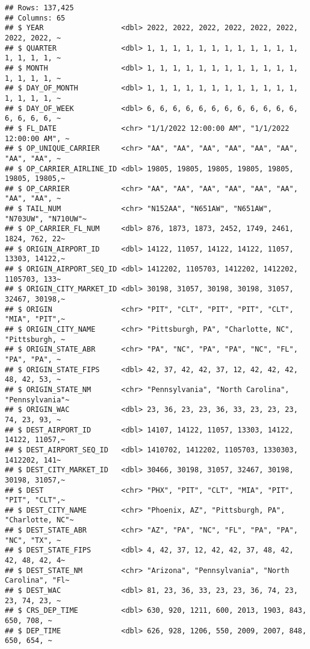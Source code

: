 \documentclass[
]{article}
\begin{document}
\begin{verbatim}
## Rows: 137,425
## Columns: 65
## $ YEAR                  <dbl> 2022, 2022, 2022, 2022, 2022, 2022, 2022, 2022, ~
## $ QUARTER               <dbl> 1, 1, 1, 1, 1, 1, 1, 1, 1, 1, 1, 1, 1, 1, 1, 1, ~
## $ MONTH                 <dbl> 1, 1, 1, 1, 1, 1, 1, 1, 1, 1, 1, 1, 1, 1, 1, 1, ~
## $ DAY_OF_MONTH          <dbl> 1, 1, 1, 1, 1, 1, 1, 1, 1, 1, 1, 1, 1, 1, 1, 1, ~
## $ DAY_OF_WEEK           <dbl> 6, 6, 6, 6, 6, 6, 6, 6, 6, 6, 6, 6, 6, 6, 6, 6, ~
## $ FL_DATE               <chr> "1/1/2022 12:00:00 AM", "1/1/2022 12:00:00 AM", ~
## $ OP_UNIQUE_CARRIER     <chr> "AA", "AA", "AA", "AA", "AA", "AA", "AA", "AA", ~
## $ OP_CARRIER_AIRLINE_ID <dbl> 19805, 19805, 19805, 19805, 19805, 19805, 19805,~
## $ OP_CARRIER            <chr> "AA", "AA", "AA", "AA", "AA", "AA", "AA", "AA", ~
## $ TAIL_NUM              <chr> "N152AA", "N651AW", "N651AW", "N703UW", "N710UW"~
## $ OP_CARRIER_FL_NUM     <dbl> 876, 1873, 1873, 2452, 1749, 2461, 1824, 762, 22~
## $ ORIGIN_AIRPORT_ID     <dbl> 14122, 11057, 14122, 14122, 11057, 13303, 14122,~
## $ ORIGIN_AIRPORT_SEQ_ID <dbl> 1412202, 1105703, 1412202, 1412202, 1105703, 133~
## $ ORIGIN_CITY_MARKET_ID <dbl> 30198, 31057, 30198, 30198, 31057, 32467, 30198,~
## $ ORIGIN                <chr> "PIT", "CLT", "PIT", "PIT", "CLT", "MIA", "PIT",~
## $ ORIGIN_CITY_NAME      <chr> "Pittsburgh, PA", "Charlotte, NC", "Pittsburgh, ~
## $ ORIGIN_STATE_ABR      <chr> "PA", "NC", "PA", "PA", "NC", "FL", "PA", "PA", ~
## $ ORIGIN_STATE_FIPS     <dbl> 42, 37, 42, 42, 37, 12, 42, 42, 42, 48, 42, 53, ~
## $ ORIGIN_STATE_NM       <chr> "Pennsylvania", "North Carolina", "Pennsylvania"~
## $ ORIGIN_WAC            <dbl> 23, 36, 23, 23, 36, 33, 23, 23, 23, 74, 23, 93, ~
## $ DEST_AIRPORT_ID       <dbl> 14107, 14122, 11057, 13303, 14122, 14122, 11057,~
## $ DEST_AIRPORT_SEQ_ID   <dbl> 1410702, 1412202, 1105703, 1330303, 1412202, 141~
## $ DEST_CITY_MARKET_ID   <dbl> 30466, 30198, 31057, 32467, 30198, 30198, 31057,~
## $ DEST                  <chr> "PHX", "PIT", "CLT", "MIA", "PIT", "PIT", "CLT",~
## $ DEST_CITY_NAME        <chr> "Phoenix, AZ", "Pittsburgh, PA", "Charlotte, NC"~
## $ DEST_STATE_ABR        <chr> "AZ", "PA", "NC", "FL", "PA", "PA", "NC", "TX", ~
## $ DEST_STATE_FIPS       <dbl> 4, 42, 37, 12, 42, 42, 37, 48, 42, 42, 48, 42, 4~
## $ DEST_STATE_NM         <chr> "Arizona", "Pennsylvania", "North Carolina", "Fl~
## $ DEST_WAC              <dbl> 81, 23, 36, 33, 23, 23, 36, 74, 23, 23, 74, 23, ~
## $ CRS_DEP_TIME          <dbl> 630, 920, 1211, 600, 2013, 1903, 843, 650, 708, ~
## $ DEP_TIME              <dbl> 626, 928, 1206, 550, 2009, 2007, 848, 650, 654, ~

\end{verbatim}
\end{document}
